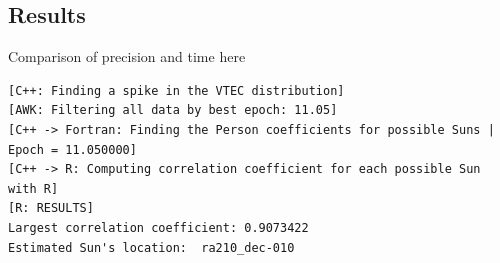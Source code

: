\subsection{Results}

Comparison of precision and time here



\begin{lstlisting}[caption=Brute force approach algorithm output]
[C++: Finding a spike in the VTEC distribution]
[AWK: Filtering all data by best epoch: 11.05]
[C++ -> Fortran: Finding the Person coefficients for possible Suns | Epoch = 11.050000]
[C++ -> R: Computing correlation coefficient for each possible Sun with R]
[R: RESULTS] 
Largest correlation coefficient: 0.9073422 
Estimated Sun's location:  ra210_dec-010
\end{lstlisting}